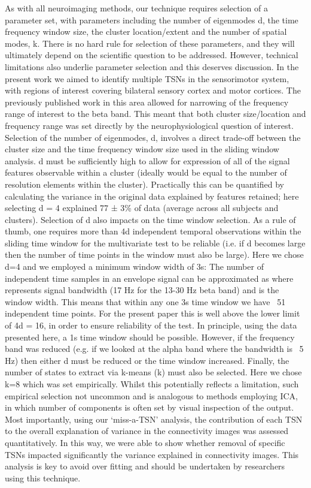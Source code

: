 As with all neuroimaging methods, our technique requires selection of a parameter set, with parameters including the number of eigenmodes d, the time frequency window size, the cluster location/extent and the number of spatial modes, k. There is no hard rule for selection of these parameters, and they will ultimately depend on the scientific question to be addressed. However, technical limitations also underlie parameter selection and this deserves discussion. In the present work we aimed to identify multiple TSNs in the sensorimotor system, with regions of interest covering bilateral sensory cortex and motor cortices. The previously published work in this area allowed for narrowing of the frequency range of interest to the beta band. This meant that both cluster size/location and frequency range was set directly by the neurophysiological question of interest. Selection of the number of eigenmodes, d, involves a direct trade-off between the cluster size and the time frequency window size used in the sliding window analysis. d must be sufficiently high to allow for expression of all of the signal features observable within a cluster (ideally   would be equal to the number of resolution elements within the cluster). Practically this can be quantified by calculating the variance in the original data explained by features retained; here selecting d = 4 explained 77 ± 3\% of data (average across all subjects and clusters). Selection of d also impacts on the time window selection. As a rule of thumb, one requires more than 4d independent temporal observations within the sliding time window for the multivariate test to be reliable (i.e. if d becomes large then the number of time points in the window must also be large). Here we chose d=4 and we employed a minimum window width of 3s: The number of independent time samples in an envelope signal can be approximated as   where   represents signal bandwidth (17 Hz for the 13-30 Hz beta band) and   is the window width. This means that within any one 3s time window we have ~51 independent time points. For the present paper this is well above the lower limit of 4d = 16, in order to ensure reliability of the test. In principle, using the data presented here, a 1s time window should be possible. However, if the frequency band was reduced (e.g. if we looked at the alpha band where the bandwidth is ~5 Hz) then either d must be reduced or the time window increased. Finally, the number of states to extract via k-means (k) must also be selected. Here we chose k=8 which was set empirically. Whilst this potentially reflects a limitation, such empirical selection not uncommon and is analogous to methods employing ICA, in which number of components is often set by visual inspection of the output. Most importantly, using our ‘miss-a-TSN’ analysis, the contribution of each TSN to the overall explanation of variance in the connectivity images was assessed quantitatively. In this way, we were able to show whether removal of specific TSNs impacted significantly the variance explained in connectivity images. This analysis is key to avoid over fitting and should be undertaken by researchers using this technique.

